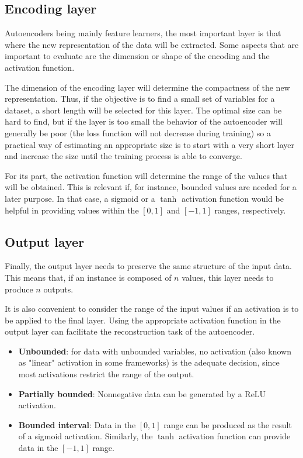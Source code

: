 \subsection{Encoding layer} 

Autoencoders being mainly feature learners, the most important layer is that where the new representation of the data will be extracted. Some aspects that are important to evaluate are the dimension or shape of the encoding and the activation function.

The dimension of the encoding layer will determine the compactness of the new representation. Thus, if the objective is to find a small set of variables for a dataset, a short length will be selected for this layer. The optimal size can be hard to find, but if the layer is too small the behavior of the autoencoder will generally be poor (the loss function will not decrease during training) so a practical way of estimating an appropriate size is to start with a very short layer and increase the size until the training process is able to converge.

For its part, the activation function will determine the range of the values that will be obtained. This is relevant if, for instance, bounded values are needed for a later purpose. In that case, a sigmoid or a $\tanh$ activation function would be helpful in providing values within the $[0,1]$ and $[-1,1]$ ranges, respectively.

\subsection{Output layer} 

Finally, the output layer needs to preserve the same structure of the input data. This means that, if an instance is composed of $n$ values, this layer needs to produce $n$ outputs.

It is also convenient to consider the range of the input values if an activation is to be applied to the final layer. 
Using the appropriate activation function in the output layer can facilitate the reconstruction task of the autoencoder. 
\begin{itemize}
    \item \textbf{Unbounded}: for data with unbounded variables, no activation (also known as "linear" activation in some frameworks) is the adequate decision, since most activations restrict the range of the output.
    \item \textbf{Partially bounded}: Nonnegative data can be generated by a ReLU activation.
    \item \textbf{Bounded interval}: Data in the $[0,1]$ range can be produced as the result of a sigmoid activation. Similarly, the $\tanh$ activation function can provide data in the $[-1,1]$ range.
\end{itemize}

